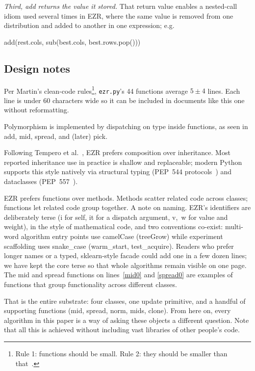 \documentclass[AMA,STIX2COL]{WileyNJDv5}
\newcommand{\IT}{{\sffamily EZR}}
\begin{document}
\textit{Third, \textsf{add} returns the value it stored.} That
return value enables a nested-call idiom used several times in
\IT{}, where the same value is removed from one distribution
and added to another in one expression; e.g.
\begin{repl}
add(rest.cols, sub(best.cols, best.rows.pop()))
\end{repl}

\subsection{Design notes}

Per Martin's clean-code rules\footnote{Rule 1: functions
should be small. Rule 2: they should be smaller than
that~\cite{martin2009clean}.}, \texttt{ezr.py}'s 44 functions
average $5\pm4$ lines. Each line is under 60 characters wide
so it can be included in documents like this one without
reformatting.

Polymorphism is implemented by dispatching on type
inside functions, as seen in \textsf{add}, \textsf{mid},
\textsf{spread}, and (later) \textsf{pick}.

Following Tempero et al.\ \cite{tempero13},
  \IT{} prefers composition over inheritance. Most reported
  inheritance use in practice is shallow and replaceable; modern
  Python supports this style natively via structural typing
  (PEP~544 protocols~\cite{pep544}) and dataclasses
  (PEP~557~\cite{pep557}).

\IT{} prefers functions over methods. Methods scatter
related code across classes; functions let related code group
together.
A note on naming. \IT{}'s identifiers are deliberately terse
(\textsf{i} for self, \textsf{it} for a dispatch argument,
\textsf{v},~\textsf{w} for value and weight), in the style of
mathematical code, and two conventions co-exist: multi-word
algorithm entry points use camelCase (\textsf{treeGrow}) while
experiment scaffolding uses snake\_case (\textsf{warm\_start},
\textsf{test\_acquire}). Readers who prefer longer names or a
typed, sklearn-style facade could add one in a few dozen lines;
we have kept the core terse so that whole algorithms remain
visible on one page. The \textsf{mid} and \textsf{spread} functions on
lines~\ref{mid0} and \ref{spread0} are examples of functions
that group functionality across different classes.

That is the entire substrate: four classes, one update
primitive, and a handful of supporting functions
(\textsf{mid}, \textsf{spread}, \textsf{norm}, \textsf{mids},
\textsf{clone}). From here on, every algorithm in this paper
is a way of asking these objects a different question. Note
that all this is achieved without including vast libraries
of other people's code.
\end{document}
